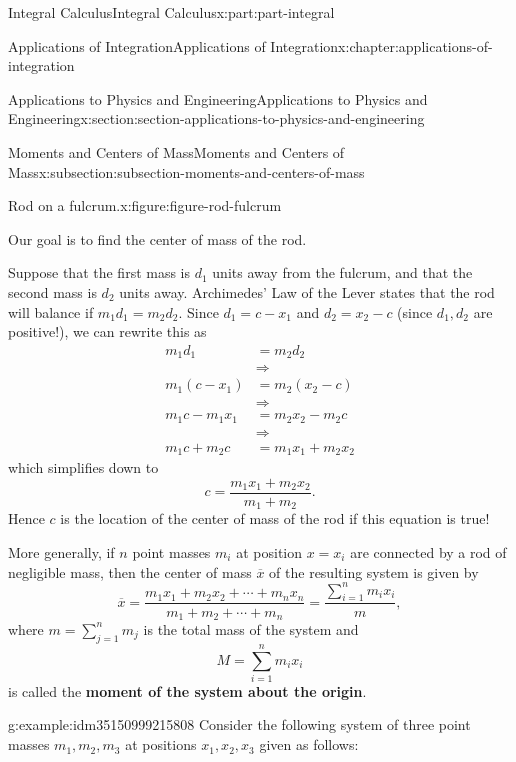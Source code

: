 \documentclass[twoside,10pt,]{book}
\newcommand{\terminology}[1]{\textbf{#1}}
\numberwithin{equation}{part}
\newcommand{\amp}{&}
\begin{document}
\begin{partptx}{Integral Calculus}{}{Integral Calculus}{}{}{x:part:part-integral}
\begin{chapterptx}{Applications of Integration}{}{Applications of Integration}{}{}{x:chapter:applications-of-integration}
\begin{sectionptx}{Applications to Physics and Engineering}{}{Applications to Physics and Engineering}{}{}{x:section:section-applications-to-physics-and-engineering}
\begin{subsectionptx}{Moments and Centers of Mass}{}{Moments and Centers of Mass}{}{}{x:subsection:subsection-moments-and-centers-of-mass}
\begin{figureptx}{Rod on a fulcrum.}{x:figure:figure-rod-fulcrum}{}
\begin{image}{0}{1}{0}
{
}%
\end{image}%
\tcblower
\end{figureptx}%
Our goal is to find the center of mass of the rod.%
\par
Suppose that the first mass is \(d_{1}\) units away from the fulcrum, and that the second mass is \(d_{2}\) units away. Archimedes' Law of the Lever states that the rod will balance if \(m_{1}d_{1} = m_{2}d_{2}\). Since \(d_{1} = c - x_{1}\) and \(d_{2} = x_{2} - c\) (since \(d_{1},d_{2}\) are positive!), we can rewrite this as%
\begin{align*}
m_{1}d_{1} \amp= m_{2}d_{2}\\
\amp\Rightarrow\\
m_{1}(c-x_{1}) \amp= m_{2}(x_{2}-c)\\
\amp\Rightarrow\\
m_{1}c-m_{1}x_{1} \amp= m_{2}x_{2} - m_{2}c\\
\amp\Rightarrow\\
m_{1}c+m_{2}c \amp= m_{1}x_{1}+m_{2}x_{2}
\end{align*}
which simplifies down to%
\begin{equation*}
c = \frac{m_{1}x_{1}+m_{2}x_{2}}{m_{1}+m_{2}}.
\end{equation*}
Hence \(c\) is the location of the center of mass of the rod if this equation is true!%
\par
More generally, if \(n\) point masses \(m_{i}\) at position \(x=x_{i}\) are connected by a rod of negligible mass, then the center of mass \(\overline{x}\) of the resulting system is given by%
\begin{equation*}
\overline{x} = \frac{m_{1}x_{1}+m_{2}x_{2}+\cdots+m_{n}x_{n}}{m_{1}+m_{2}+\cdots+m_{n}} = \frac{\sum_{i=1}^{n}m_{i}x_{i}}{m},
\end{equation*}
where \(m = \sum_{j=1}^{n}m_{j}\) is the total mass of the system and%
\begin{equation*}
M = \sum_{i=1}^{n}m_{i}x_{i}
\end{equation*}
is called the \terminology{moment of the system about the origin}.%
\begin{example}{}{g:example:idm35150999215808}%
Consider the following system of three point masses \(m_{1},m_{2},m_{3}\) at positions \(x_{1},x_{2},x_{3}\) given as follows:%

\end{example}
\end{subsectionptx}
\end{sectionptx}
\end{chapterptx}
\end{partptx}
\end{document}
